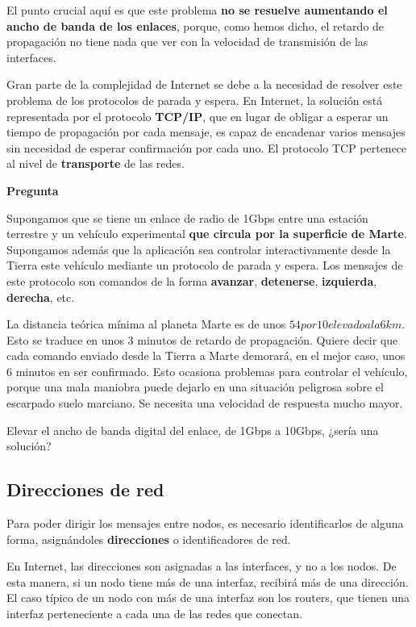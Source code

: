 \documentclass[spanish,A4,]{article}
\begin{document}
El punto crucial aquí es que este problema \textbf{no se resuelve
aumentando el ancho de banda de los enlaces}, porque, como hemos dicho,
el retardo de propagación no tiene nada que ver con la velocidad de
transmisión de las interfaces.

Gran parte de la complejidad de Internet se debe a la necesidad de
resolver este problema de los protocolos de parada y espera. En
Internet, la solución está representada por el protocolo
\textbf{TCP/IP}, que en lugar de obligar a esperar un tiempo de
propagación por cada mensaje, es capaz de encadenar varios mensajes sin
necesidad de esperar confirmación por cada uno. El protocolo TCP
pertenece al nivel de \textbf{transporte} de las redes.

\textbf{Pregunta}

Supongamos que se tiene un enlace de radio de 1Gbps entre una estación
terrestre y un vehículo experimental \textbf{que circula por la
superficie de Marte}. Supongamos además que la aplicación sea controlar
interactivamente desde la Tierra este vehículo mediante un protocolo de
parada y espera. Los mensajes de este protocolo son comandos de la forma
\textbf{avanzar}, \textbf{detenerse}, \textbf{izquierda},
\textbf{derecha}, etc.

La distancia teórica mínima al planeta Marte es de unos
$54  por  10 elevado a la 6 km$. Esto se traduce en unos 3 minutos de retardo de
propagación. Quiere decir que cada comando enviado desde la Tierra a
Marte demorará, en el mejor caso, unos 6 minutos en ser confirmado. Esto
ocasiona problemas para controlar el vehículo, porque una mala maniobra
puede dejarlo en una situación peligrosa sobre el escarpado suelo
marciano. Se necesita una velocidad de respuesta mucho mayor.

Elevar el ancho de banda digital del enlace, de 1Gbps a 10Gbps, ¿sería
una solución?

\subsection{Direcciones de red}\label{direcciones-de-red}

Para poder dirigir los mensajes entre nodos, es necesario identificarlos
de alguna forma, asignándoles \textbf{direcciones} o identificadores de
red.

En Internet, las direcciones son asignadas a las interfaces, y no a los
nodos. De esta manera, si un nodo tiene más de una interfaz, recibirá
más de una dirección. El caso típico de un nodo con más de una interfaz
son los routers, que tienen una interfaz perteneciente a cada una de las
redes que conectan.
\end{document}
